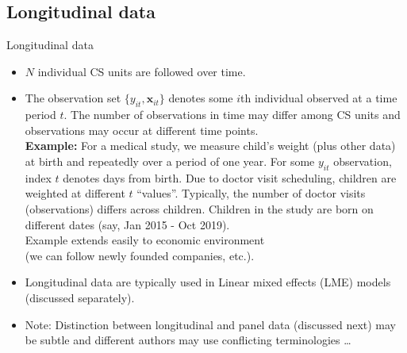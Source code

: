 \documentclass[usenames,dvipsnames]{beamer}
\begin{document}
\subsection*{Longitudinal data}
\begin{frame}{Longitudinal data}
\footnotesize
\begin{itemize}
\item $N$ individual CS units are followed over time.
\medskip
\item The observation set $\{y_{it},\bm{x}_{it}\}$ denotes some $i$th individual  observed at a time period $t$. The number of observations in time may differ among CS units and observations may occur at different time points. \\ \medskip 
\textbf{Example:} For a medical study, we measure child's weight (plus other data) at birth and repeatedly over a period of one year. For some $y_{it}$ observation, index $t$ denotes days from birth. Due to doctor visit scheduling, children are weighted at different $t$ ``values''. Typically, the number of doctor visits (observations) differs across children. Children in the study are born on different dates (say, Jan 2015 - Oct 2019). \\ \medskip Example extends easily to economic environment \\(we can follow newly founded companies, etc.).
\medskip
\item Longitudinal data are typically used in Linear mixed effects (LME) models (discussed separately).
\medskip
\item Note: Distinction between longitudinal and panel data (discussed next) may be subtle and different authors may use conflicting terminologies \dots
\end{itemize}
\end{frame}
\end{document}

